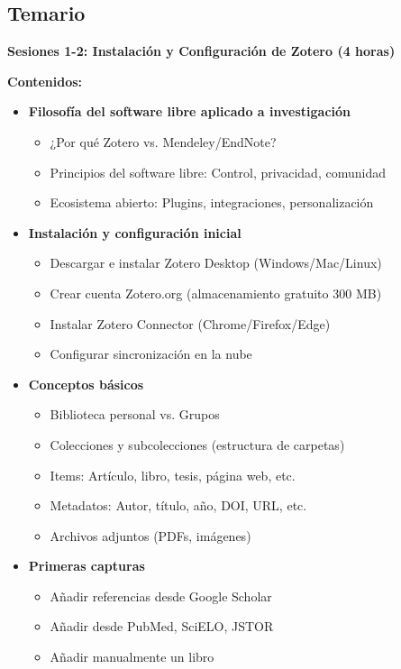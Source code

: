 \documentclass[12pt,a4paper]{yaac-luatex}
\newcommand{\subsecciontitulo}[1]{
	{\color{maincolor}\large\bfseries #1}
}
\begin{document}
	\subsection*{Temario}
	
	\begin{tcolorbox}[
		enhanced,
		colback=white,
		colframe=curso2color,
		arc=3pt,
		boxrule=1.5pt,
		left=10pt,
		right=10pt,
		top=8pt,
		bottom=8pt,
		breakable
		]
		\subsecciontitulo{Sesiones 1-2: Instalación y Configuración de Zotero (4 horas)}
		
		\textbf{Contenidos:}
		\begin{itemize}[leftmargin=*, itemsep=0.1cm]
			\item \textbf{Filosofía del software libre aplicado a investigación}
			\begin{itemize}
				\item ¿Por qué Zotero vs. Mendeley/EndNote?
				\item Principios del software libre: Control, privacidad, comunidad
				\item Ecosistema abierto: Plugins, integraciones, personalización
			\end{itemize}
			\item \textbf{Instalación y configuración inicial}
			\begin{itemize}
				\item Descargar e instalar Zotero Desktop (Windows/Mac/Linux)
				\item Crear cuenta Zotero.org (almacenamiento gratuito 300 MB)
				\item Instalar Zotero Connector (Chrome/Firefox/Edge)
				\item Configurar sincronización en la nube
			\end{itemize}
			\item \textbf{Conceptos básicos}
			\begin{itemize}
				\item Biblioteca personal vs. Grupos
				\item Colecciones y subcolecciones (estructura de carpetas)
				\item Items: Artículo, libro, tesis, página web, etc.
				\item Metadatos: Autor, título, año, DOI, URL, etc.
				\item Archivos adjuntos (PDFs, imágenes)
			\end{itemize}
			\item \textbf{Primeras capturas}
			\begin{itemize}
				\item Añadir referencias desde Google Scholar
				\item Añadir desde PubMed, SciELO, JSTOR
				\item Añadir manualmente un libro
			\end{itemize}
		\end{itemize}
		

\end{tcolorbox}
\end{document}
